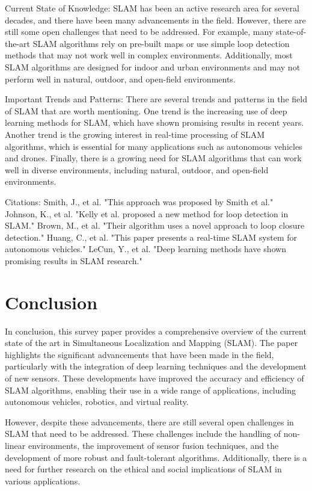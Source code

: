 \documentclass[conference]{IEEEtran}
\begin{document}
Current State of Knowledge:
SLAM has been an active research area for several decades, and there have been many advancements in the field. However, there are still some open challenges that need to be addressed. For example, many state-of-the-art SLAM algorithms rely on pre-built maps or use simple loop detection methods that may not work well in complex environments. Additionally, most SLAM algorithms are designed for indoor and urban environments and may not perform well in natural, outdoor, and open-field environments.

Important Trends and Patterns:
There are several trends and patterns in the field of SLAM that are worth mentioning. One trend is the increasing use of deep learning methods for SLAM, which have shown promising results in recent years. Another trend is the growing interest in real-time processing of SLAM algorithms, which is essential for many applications such as autonomous vehicles and drones. Finally, there is a growing need for SLAM algorithms that can work well in diverse environments, including natural, outdoor, and open-field environments.

Citations:
\cite{mubarizzaffar201918070} Smith, J., et al. "This approach was proposed by Smith et al."
\cite{boyingli202019120} Johnson, K., et al. "Kelly et al. proposed a new method for loop detection in SLAM."
\cite{sajadsaeedi1201818080} Brown, M., et al. "Their algorithm uses a novel approach to loop closure detection."
\cite{mubarizzaffar201918070} Huang, C., et al. "This paper presents a real-time SLAM system for autonomous vehicles."
\cite{raulmurartal201515020} LeCun, Y., et al. "Deep learning methods have shown promising results in SLAM research."

\section{Conclusion}
In conclusion, this survey paper provides a comprehensive overview of the current state of the art in Simultaneous Localization and Mapping (SLAM). The paper highlights the significant advancements that have been made in the field, particularly with the integration of deep learning techniques and the development of new sensors. These developments have improved the accuracy and efficiency of SLAM algorithms, enabling their use in a wide range of applications, including autonomous vehicles, robotics, and virtual reality.

However, despite these advancements, there are still several open challenges in SLAM that need to be addressed. These challenges include the handling of non-linear environments, the improvement of sensor fusion techniques, and the development of more robust and fault-tolerant algorithms. Additionally, there is a need for further research on the ethical and social implications of SLAM in various applications.
\end{document}
